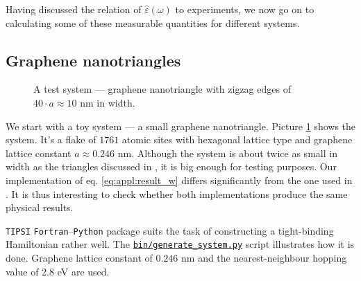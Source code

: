 \documentclass[a4paper,12pt]{article}
\begin{document}
    Having discussed the relation of $\hat\varepsilon(\omega)$ to experiments, we now go on to calculating some of these measurable quantities for different systems.

\newpage
\subsection{Graphene nanotriangles}
\label{sec:nanotriangles}
    \begin{figure}
        \center
        \vspace{-1.3cm}
        
        \captionsetup{width=0.4\textwidth, skip=10pt}
        \caption{A test system --- graphene nanotriangle with zigzag edges of $40\cdot a \approx 10$ nm in width.}
        \label{fig:coordinates-ZigZag-40}
    \end{figure}
    We start with a toy system --- a small graphene nanotriangle. Picture \ref{fig:coordinates-ZigZag-40} shows the system. It's a flake of $1761$ atomic sites with hexagonal lattice type and graphene lattice constant $a \approx 0.246$ nm. Although the system is about twice as small in width as the triangles discussed in \cite{plasmonic2015}, it is big enough for testing purposes. Our implementation of eq. \eqref{eq:appl:result_w} differs significantly from the one used in \cite{plasmonic2015}. It is thus interesting to check whether both implementations produce the same physical results.

    \texttt{TIPSI} \texttt{Fortran}--\texttt{Python} package \cite{tipsi} suits the task of constructing a tight-binding Hamiltonian rather well. The \hyperref[code]{\texttt{bin/generate\_system.py}} script illustrates how it is done. Graphene lattice constant of $0.246$ nm and the nearest-neighbour hopping value of $2.8$ eV are used.

    \begin{figure}[h]
    \vspace{-0.3cm}
    \begin{minipage}{\textwidth}
        
        \captionsetup{skip=5pt}
        \label{fig:spectrum-ZigZag-40}
    \end{minipage}
    \begin{minipage}{\textwidth}
        \vspace{-1.0cm}
        
        \captionsetup{skip=0pt}
        \label{fig:eigenmodes-ZigZag-40}
    \end{minipage}
    \end{figure}
\end{document}

